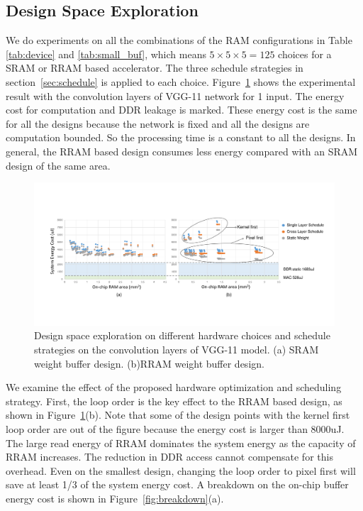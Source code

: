 \subsection{Design Space Exploration}
We do experiments on all the combinations of the RAM configurations in Table \ref{tab:device} and \ref{tab:small_buf}, which means $5\times 5\times 5 = 125$ choices for a SRAM or RRAM based accelerator. The three schedule strategies in section~\ref{sec:schedule} is applied to each choice. Figure~\ref{fig:design_space} shows the experimental result with the convolution layers of VGG-11 network for 1 input. The energy cost for computation and DDR leakage is marked. These energy cost is the same for all the designs because the network is fixed and all the designs are computation bounded. So the processing time is a constant to all the designs. In general, the RRAM based design consumes less energy compared with an SRAM design of the same area.

\begin{figure}[t]
  \centering
  \includegraphics[width=2\columnwidth]{fig/design_space.pdf}
  \caption{Design space exploration on different hardware choices and schedule strategies on the convolution layers of VGG-11 model. (a) SRAM weight buffer design. (b)RRAM weight buffer design.}
  \label{fig:design_space}
\end{figure}

We examine the effect of the proposed hardware optimization and scheduling strategy. First, the loop order is the key effect to the RRAM based design, as shown in Figure~\ref{fig:design_space}(b). Note that some of the design points with the kernel first loop order are out of the figure because the energy cost is larger than 8000uJ. The large read energy of RRAM dominates the system energy as the capacity of RRAM increases. The reduction in DDR access cannot compensate for this overhead. Even on the smallest design, changing the loop order to pixel first will save at least 1/3 of the system energy cost. A breakdown on the on-chip buffer energy cost is shown in Figure~\ref{fig:breakdown}(a).

